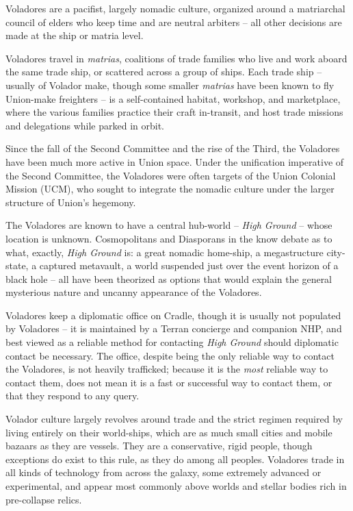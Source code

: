 Voladores are a pacifist, largely nomadic culture, organized around a matriarchal council of elders
who keep time and are neutral arbiters -- all other decisions are made at the ship or matria level.

Voladores travel in \textit{matrias}, coalitions of trade families who live and work aboard the same trade
ship, or scattered across a group of ships. Each trade ship -- usually of Volador make, though
some smaller \textit{matrias} have been known to fly Union-make freighters -- is a self-contained
habitat, workshop, and marketplace, where the various families practice their craft in-transit, and
host trade missions and delegations while parked in orbit.

Since the fall of the Second Committee and the rise of the Third, the Voladores have been much
more active in Union space. Under the unification imperative of the Second Committee, the
Voladores were often targets of the Union Colonial Mission (UCM), who sought to integrate the
nomadic culture under the larger structure of Union’s hegemony.

The Voladores are known to have a central hub-world -- \textit{High Ground} -- whose location is
unknown. Cosmopolitans and Diasporans in the know debate as to what, exactly, \textit{High Ground}
is: a great nomadic home-ship, a megastructure city-state, a captured metavault, a world
suspended just over the event horizon of a black hole -- all have been theorized as options that
would explain the general mysterious nature and uncanny appearance of the Voladores.

Voladores keep a diplomatic office on Cradle, though it is usually not populated by Voladores -- it
is maintained by a Terran concierge and companion NHP, and best viewed as a reliable method
for contacting \textit{High Ground} should diplomatic contact be necessary. The office, despite being
the only reliable way to contact the Voladores, is not heavily trafficked; because it is the \textit{most}
reliable way to contact them, does not mean it is a fast or successful way to contact them, or
that they respond to any query.

Volador culture largely revolves around trade and the strict regimen required by living entirely on
their world-ships, which are as much small cities and mobile bazaars as they are vessels. They
are a conservative, rigid people, though exceptions do exist to this rule, as they do among all
peoples. Voladores trade in all kinds of technology from across the galaxy, some extremely
advanced or experimental, and appear most commonly above worlds and stellar bodies rich in
pre-collapse relics.

